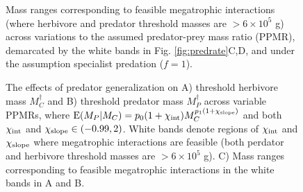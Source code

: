 \documentclass[11pt]{article}
\begin{document}
\begin{figure}[h!]
  \caption{
    Mass ranges corresponding to feasible megatrophic interactions (where herbivore and predator threshold masses are $> 6\times10^5$ g) across variations to the assumed predator-prey mass ratio (PPMR), demarcated by the white bands in Fig. \ref{fig:predrate}C,D, and under the assumption specialist predation ($f=1$). 
  }
  \label{fig:megamammal}
\end{figure}

\begin{figure}[h!]
  \caption{
    The effects of predator generalization on A) threshold herbivore mass $M_C^\dagger$ and B) threshold predator mass $M_P^\dagger$ across variable PPMRs, where ${\rm E}(M_P|M_C) = p_0(1+\chi_{\rm int}) M_C^{p_1(1+\chi_{\rm slope})}$ and both $\chi_{\rm int}$ and $\chi_{\rm slope} \in (-0.99,2)$.
    White bands denote regions of $\chi_{\rm int}$ and $\chi_{\rm slope}$ where megatrophic interactions are feasible (both perdator and herbivore threshold masses are $> 6\times10^5$ g).
    C) Mass ranges corresponding to feasible megatrophic interactions in the white bands in A and B.
  }
  \label{fig:megamammalgen}
\end{figure}

\begin{figure}[h!]
\caption{
  }
  \label{fig:harvestscaling}
\end{figure}



\renewcommand{\thefigure}{B\arabic{figure}}
\setcounter{figure}{0}
\end{document}

